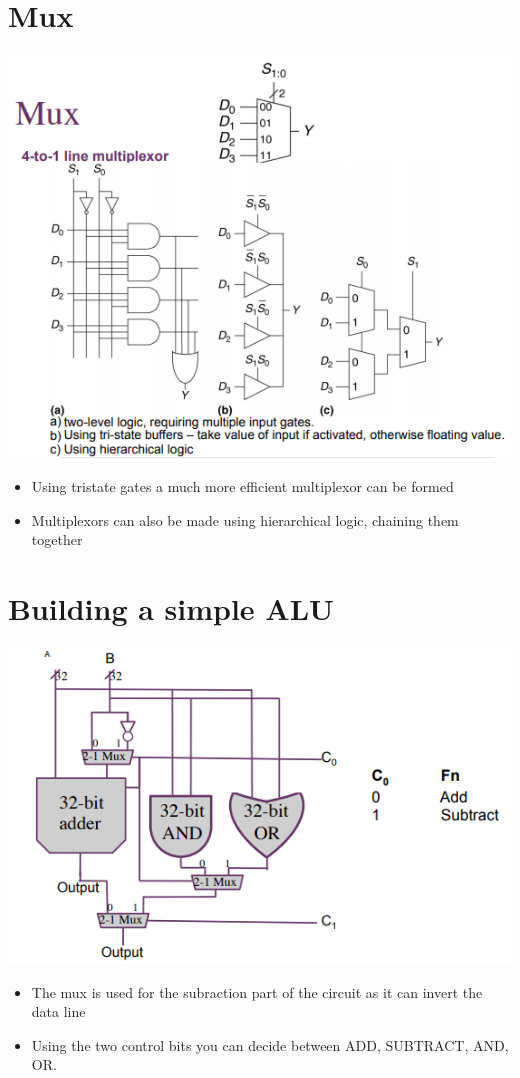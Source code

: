 \documentclass{article}[18pt]
\begin{document}
\section{Mux}
\begin{center}
	\includegraphics[scale=0.7]{mux}
\end{center}
\begin{itemize}
	\item Using tristate gates a much more efficient multiplexor can be formed
	\item Multiplexors can also be made using hierarchical logic, chaining them together
\end{itemize}
\section{Building a simple ALU}
\begin{center}
	\includegraphics[scale=0.7]{ALU}
\end{center}
\begin{itemize}
	\item The mux is used for the subraction part of the circuit as it can invert the data line
	\item Using the two control bits you can decide between ADD, SUBTRACT, AND, OR. 
\end{itemize}
\end{document}

